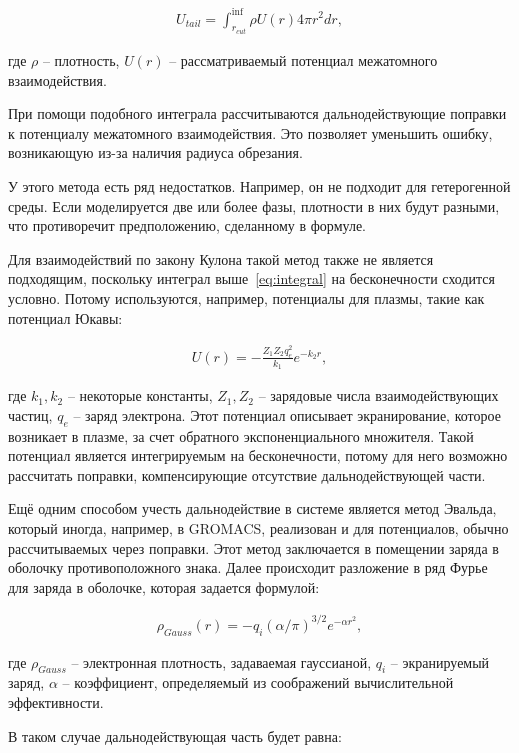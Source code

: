 \begin{align}
	\label{eq:integral}
	U_{tail} = \int_{r_{cut}}^{\inf} \rho U(r) 4 \pi r^2 dr,
\end{align}

где $\rho$ \--- плотность, $U(r)$ \--- рассматриваемый потенциал межатомного взаимодействия.

При помощи подобного интеграла рассчитываются дальнодействующие поправки к потенциалу межатомного взаимодействия. Это позволяет уменьшить ошибку, возникающую из-за наличия радиуса обрезания. 

У этого метода есть ряд недостатков. Например, он не подходит для гетерогенной среды. Если моделируется две или более фазы, плотности в них будут разными, что противоречит предположению, сделанному в формуле.

Для взаимодействий по закону Кулона такой метод также не является подходящим, поскольку интеграл выше~\cref{eq:integral} на бесконечности сходится условно. Потому используются, например, потенциалы для плазмы, такие как потенциал Юкавы:

\begin{align}
    U(r) = - \frac{Z_1 Z_2 q_e^2}{k_1} e^{-k_2r},
\end{align}

где $k_1, k_2$ \--- некоторые константы, $Z_1, Z_2$ \--- зарядовые числа взаимодействующих частиц, $q_e$ \--- заряд электрона. Этот потенциал описывает экранирование, которое возникает в плазме, за счет обратного экспоненциального множителя. Такой потенциал является интегрируемым на бесконечности, потому для него возможно рассчитать поправки, компенсирующие отсутствие дальнодействующей части.

Ещё одним способом учесть дальнодействие в системе является метод Эвальда, который иногда, например, в GROMACS, реализован и для потенциалов, обычно рассчитываемых через поправки. Этот метод заключается в помещении заряда в оболочку противоположного знака. Далее происходит разложение в ряд Фурье для заряда в оболочке, которая задается формулой:

\begin{align}
    \rho_{Gauss}(r) = - q_i (\alpha / \pi)^{3/2} e^{-\alpha r^2},
\end{align}


где $\rho_{Gauss}$ \--- электронная плотность, задаваемая гауссианой, $q_i$ \--- экранируемый заряд, $\alpha$ \--- коэффициент, определяемый из соображений вычислительной эффективности.

В таком случае дальнодействующая часть будет равна:

